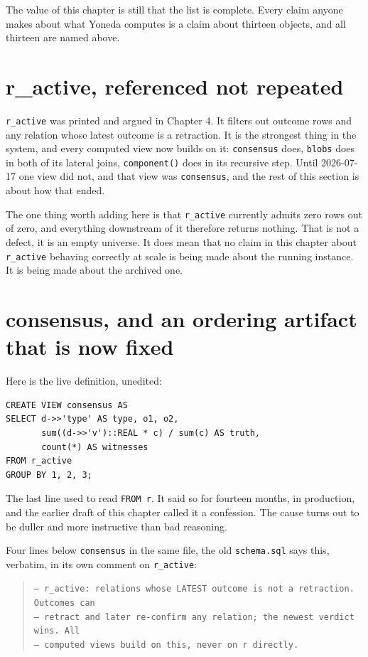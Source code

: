 The value of this chapter is still that the list is complete. Every claim anyone makes about what Yoneda computes is a claim about thirteen objects, and all thirteen are named above.

\section{r\_active, referenced not repeated}

\texttt{r\_active} was printed and argued in Chapter 4. It filters out outcome rows and any relation whose latest outcome is a retraction. It is the strongest thing in the system, and every computed view now builds on it: \texttt{consensus} does, \texttt{blobs} does in both of its lateral joins, \texttt{component()} does in its recursive step. Until 2026-07-17 one view did not, and that view was \texttt{consensus}, and the rest of this section is about how that ended.

The one thing worth adding here is that \texttt{r\_active} currently admits zero rows out of zero, and everything downstream of it therefore returns nothing. That is not a defect, it is an empty universe. It does mean that no claim in this chapter about \texttt{r\_active} behaving correctly at scale is being made about the running instance. It is being made about the archived one.

\section{consensus, and an ordering artifact that is now fixed}

Here is the live definition, unedited:

\begin{verbatim}
CREATE VIEW consensus AS
SELECT d->>'type' AS type, o1, o2,
       sum((d->>'v')::REAL * c) / sum(c) AS truth,
       count(*) AS witnesses
FROM r_active
GROUP BY 1, 2, 3;
\end{verbatim}

The last line used to read \texttt{FROM r}. It said so for fourteen months, in production, and the earlier draft of this chapter called it a confession. The cause turns out to be duller and more instructive than bad reasoning.

Four lines below \texttt{consensus} in the same file, the old \texttt{schema.sql} says this, verbatim, in its own comment on \texttt{r\_active}:

\begin{quote}
\texttt{-- r\_active: relations whose LATEST outcome is not a retraction. Outcomes can}\\
\texttt{-- retract and later re-confirm any relation; the newest verdict wins. All}\\
\texttt{-- computed views build on this, never on r directly.}
\end{quote}


